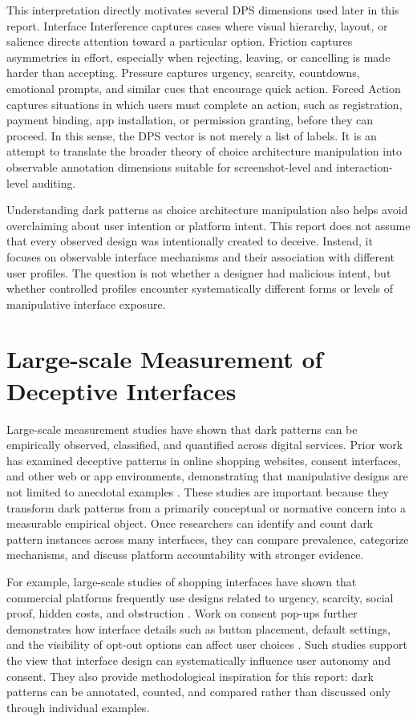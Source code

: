 This interpretation directly motivates several DPS dimensions used later in this report. Interface Interference captures cases where visual hierarchy, layout, or salience directs attention toward a particular option. Friction captures asymmetries in effort, especially when rejecting, leaving, or cancelling is made harder than accepting. Pressure captures urgency, scarcity, countdowns, emotional prompts, and similar cues that encourage quick action. Forced Action captures situations in which users must complete an action, such as registration, payment binding, app installation, or permission granting, before they can proceed. In this sense, the DPS vector is not merely a list of labels. It is an attempt to translate the broader theory of choice architecture manipulation into observable annotation dimensions suitable for screenshot-level and interaction-level auditing.

Understanding dark patterns as choice architecture manipulation also helps avoid overclaiming about user intention or platform intent. This report does not assume that every observed design was intentionally created to deceive. Instead, it focuses on observable interface mechanisms and their association with different user profiles. The question is not whether a designer had malicious intent, but whether controlled profiles encounter systematically different forms or levels of manipulative interface exposure.

\section{Large-scale Measurement of Deceptive Interfaces}

Large-scale measurement studies have shown that dark patterns can be empirically observed, classified, and quantified across digital services. Prior work has examined deceptive patterns in online shopping websites, consent interfaces, and other web or app environments, demonstrating that manipulative designs are not limited to anecdotal examples \cite{mathur2019darkpatterns,nouwens2020gdpr,mathur2021whatmakesdark}. These studies are important because they transform dark patterns from a primarily conceptual or normative concern into a measurable empirical object. Once researchers can identify and count dark pattern instances across many interfaces, they can compare prevalence, categorize mechanisms, and discuss platform accountability with stronger evidence.

For example, large-scale studies of shopping interfaces have shown that commercial platforms frequently use designs related to urgency, scarcity, social proof, hidden costs, and obstruction \cite{mathur2019darkpatterns}. Work on consent pop-ups further demonstrates how interface details such as button placement, default settings, and the visibility of opt-out options can affect user choices \cite{nouwens2020gdpr}. Such studies support the view that interface design can systematically influence user autonomy and consent. They also provide methodological inspiration for this report: dark patterns can be annotated, counted, and compared rather than discussed only through individual examples.

